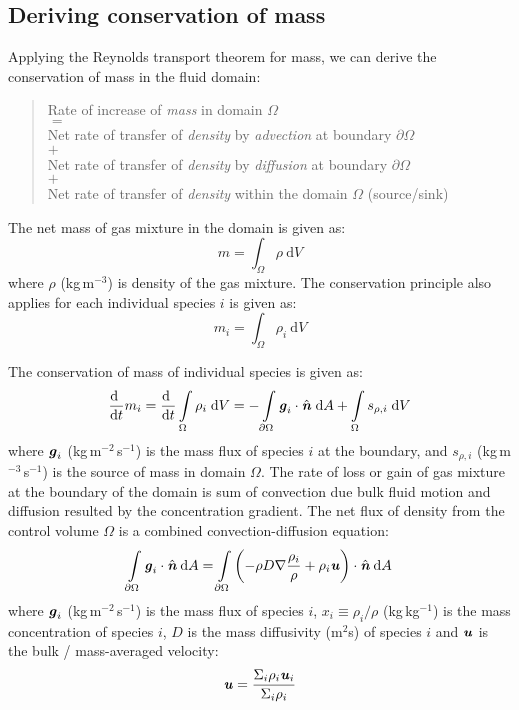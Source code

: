 \subsection{Deriving conservation of mass}

Applying the Reynolds transport theorem for mass, we can derive the conservation of mass in the fluid domain:
\begin{quote}
	\centering
	Rate of increase of \textit{mass} in domain $\Omega$\\
	$=$\\
	Net rate of transfer of \textit{density} by \textit{advection} at boundary $\partial \Omega$\\
	$+$ \\
	Net rate of transfer of \textit{density} by \textit{diffusion} at boundary $\partial \Omega$\\
	$+$\\
	Net rate of transfer of \textit{density} within the domain $\Omega$ (source/sink)
\end{quote}

The net mass of gas mixture in the domain is given as:
\begin{equation}
m = \int_\Omega  \rho \:\mathrm{d}V
\end{equation}
where $\rho$ (kg\,m$^{-3}$) is density of the gas mixture. The conservation principle also applies for each individual species $i$ is given as:
\begin{equation}
{m_i} = \int_\Omega  {{\rho _i}\:\mathrm{d}V}
\end{equation}

The conservation of mass of individual species is given as:
\begin{equation}
\frac{\mathrm{d}~}{\mathrm{d}t} {m_i} = \frac{\mathrm{d}~}{\mathrm{d}t} \int \limits_{\Omega} \rho_i\;\mathrm{d}V= - \int \limits_{\partial \Omega } \textbf{\textit{g}}_i\cdot\hat{\textbf{\textit{n}}}\;\mathrm{d}A + \int \limits_{\Omega} s_{\rho,i}\;\mathrm{d}V
\end{equation}
where $\textbf{\textit{g}}_i$ (kg\,m$^{-2}$\,s$^{-1}$) is the mass flux of species $i$ at the boundary, and $s_{\rho,i}$ (kg\,m$^{-3}$\,s$^{-1}$) is the source of mass in domain $\Omega$. The rate of loss or gain of gas mixture at the boundary of the domain is sum of convection due bulk fluid motion and diffusion resulted by the concentration gradient. The net flux of density from the control volume $\Omega$ is a combined convection-diffusion equation:
\begin{equation}
\int \limits_{\partial \Omega } {{{\textbf{\textit{g}}}_i}}  \cdot \hat{\textbf{\textit{n}}}\:\mathrm{d}A = \int \limits_{\partial \Omega } {\left( { - {\rho}{D}\nabla \frac{{{\rho _i}}}{{{\rho}}} + {\rho _i}{\textbf{\textit{u}}}} \right)}  \cdot \hat{\textbf{\textit{n}}}\:\mathrm{d}A
\label{eq:masscde}
\end{equation}
where $\textbf{\textit{g}}_i$ (kg\,m$^{-2}$\,s$^{-1}$) is the mass flux of species $i$, $x_i \equiv \rho_i/\rho$ (kg\,kg$^{-1}$) is the mass concentration of species $i$, $D$ is the mass diffusivity (m$^2$s) of species $i$ and $\textbf{\textit{u}}$ is the bulk / mass-averaged velocity:
\begin{equation}
{\textbf{\textit{u}}} = \frac{{{\Sigma _i}{\rho _i}{{\textbf{\textit{u}}}_i}}}{{{\Sigma _i}{\rho _i}}}
\end{equation}

